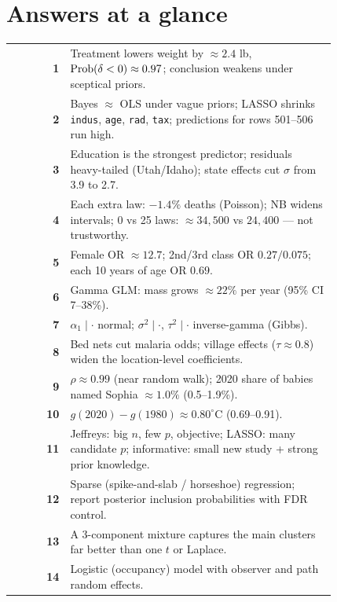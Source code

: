 \documentclass[11pt]{article}
\begin{document}

\tableofcontents
\clearpage

\section*{Answers at a glance}
\begin{center}
\small
\renewcommand{\arraystretch}{1.25}
\begin{tabular}{>{\bfseries\color{navy}}r p{0.82\linewidth}}\toprule
1  & Treatment lowers weight by $\approx2.4$ lb, $\mathrm{Prob}(\delta<0)\approx0.97$; conclusion weakens under sceptical priors.\\
2  & Bayes $\approx$ OLS under vague priors; LASSO shrinks \texttt{indus}, \texttt{age}, \texttt{rad}, \texttt{tax}; predictions for rows 501--506 run high.\\
3  & Education is the strongest predictor; residuals heavy-tailed (Utah/Idaho); state effects cut $\sigma$ from 3.9 to 2.7.\\
4  & Each extra law: $-1.4\%$ deaths (Poisson); NB widens intervals; 0 vs 25 laws: $\approx34{,}500$ vs $24{,}400$ --- not trustworthy.\\
5  & Female OR $\approx12.7$; 2nd/3rd class OR $0.27/0.075$; each 10 years of age OR $0.69$.\\
6  & Gamma GLM: mass grows $\approx22\%$ per year (95\% CI 7--38\%).\\
7  & $\alpha_1\mid\cdot$ normal; $\sigma^2\mid\cdot$, $\tau^2\mid\cdot$ inverse-gamma (Gibbs).\\
8  & Bed nets cut malaria odds; village effects ($\tau\approx0.8$) widen the location-level coefficients.\\
9  & $\rho\approx0.99$ (near random walk); 2020 share of babies named Sophia $\approx1.0\%$ (0.5--1.9\%).\\
10 & $g(2020)-g(1980)\approx0.80^\circ$C (0.69--0.91).\\
11 & Jeffreys: big $n$, few $p$, objective; LASSO: many candidate $p$; informative: small new study + strong prior knowledge.\\
12 & Sparse (spike-and-slab / horseshoe) regression; report posterior inclusion probabilities with FDR control.\\
13 & A 3-component mixture captures the main clusters far better than one $t$ or Laplace.\\
14 & Logistic (occupancy) model with observer and path random effects.\\\bottomrule
\end{tabular}
\end{center}
\clearpage
\end{document}
